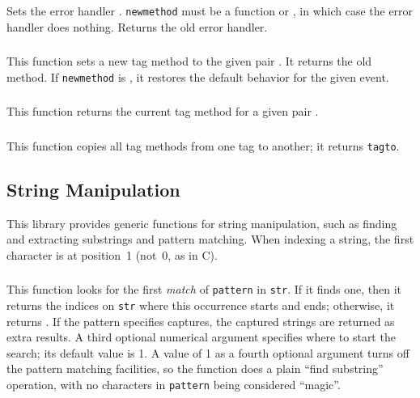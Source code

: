 \subsubsection*{\ff {}}
\label{pdf-seterrormethod}
Sets the error handler .
\verb|newmethod| must be a function or \nil,
in which case the error handler does nothing.
Returns the old error handler.

\subsubsection*{\ff {}}
This function sets a new tag method to the given pair .
It returns the old method.
If \verb|newmethod| is \nil,
it restores the default behavior for the given event.

\subsubsection*{\ff {}}
This function returns the current tag method
for a given pair .

\subsubsection*{\ff {}}
This function copies all tag methods from one tag to another;
it returns \verb|tagto|.


\subsection{String Manipulation}
This library provides generic functions for string manipulation,
such as finding and extracting substrings and pattern matching.
When indexing a string, the first character is at position~1
(not~0, as in C).

\subsubsection*{\ff {}}
This function looks for the first \emph{match} of
\verb|pattern| in \verb|str|.
If it finds one, then it returns the indices on \verb|str|
where this occurrence starts and ends;
otherwise, it returns \nil.
If the pattern specifies captures,
the captured strings are returned as extra results.
A third optional numerical argument specifies where to start the search;
its default value is 1.
A value of 1 as a fourth optional argument
turns off the pattern matching facilities,
so the function does a plain ``find substring'' operation,
with no characters in \verb|pattern| being considered ``magic''.

